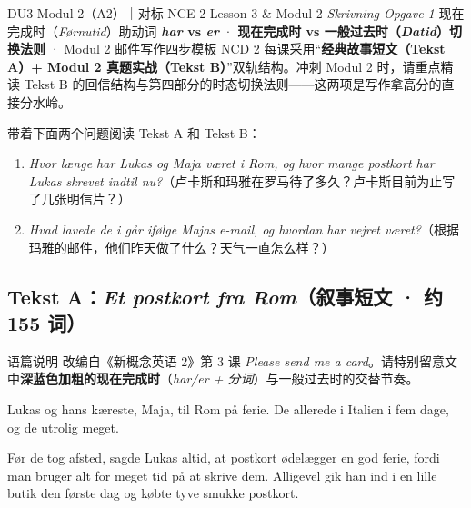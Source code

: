 {DU3 Modul 2（A2）｜对标 NCE 2 Lesson 3 \& Modul 2 \textit{Skrivning Opgave 1}}
{现在完成时（\textit{Førnutid}）助动词 \textbf{\textit{har} vs \textit{er}} · \textbf{现在完成时 vs 一般过去时（\textit{Datid}）切换法则} · Modul 2 邮件写作四步模板}
{NCD 2 每课采用“\textbf{经典故事短文（Tekst A）+ Modul 2 真题实战（Tekst B）}”双轨结构。冲刺 Modul 2 时，请重点精读 Tekst B 的回信结构与第四部分的时态切换法则——这两项是写作拿高分的直接分水岭。}

\begin{foerduleaeser}
带着下面两个问题阅读 Tekst A 和 Tekst B：
\begin{enumerate}
  \item \textit{Hvor længe har Lukas og Maja været i Rom, og hvor mange postkort har Lukas skrevet indtil nu?}（卢卡斯和玛雅在罗马待了多久？卢卡斯目前为止写了几张明信片？）
  \item \textit{Hvad lavede de i går ifølge Majas e-mail, og hvordan har vejret været?}（根据玛雅的邮件，他们昨天做了什么？天气一直怎么样？）
\end{enumerate}
\end{foerduleaeser}


\subsection*{Tekst A：\textit{Et postkort fra Rom}（叙事短文 · 约 155 词）}

\begin{tipbox}{语篇说明}
改编自《新概念英语 2》第 3 课 \textit{Please send me a card}。请特别留意文中\textbf{\color{NCDNavy}深蓝色加粗的现在完成时}（\textit{har/er + 分词}）与一般过去时的交替节奏。
\end{tipbox}

Lukas og hans kæreste, Maja,  til Rom på ferie. De  allerede  i Italien i fem dage, og de  utrolig meget.

Før de tog afsted, sagde Lukas altid, at postkort ødelægger en god ferie, fordi man bruger alt for meget tid på at skrive dem. Alligevel gik han ind i en lille butik den første dag og købte tyve smukke postkort.

